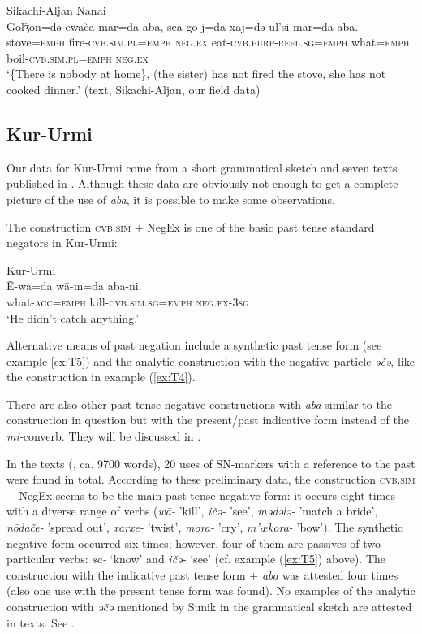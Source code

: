 \documentclass[output=paper,colorlinks,citecolor=brown]{langscibook}
\begin{document}
\ea Sikachi-Aljan Nanai \label{ex:T13}\\
	\gll Golǯon=də	ewača-mar=da	aba, sea-go-j=da	xaj=də	ul’si-mar=da	aba.\\
	stove=\textsc{emph}	fire-\textsc{cvb.sim.pl=emph}	\textsc{neg.ex} eat-\textsc{cvb.purp-refl.sg=emph}	what=\textsc{emph}	boil-\textsc{cvb.sim.pl=emph}	\textsc{neg.ex}\\
	\glt `\{There is nobody at home\}, (the sister) has not fired the stove, she has not cooked dinner.' (text, Sikachi-Aljan, our field data)
\z

\subsection{Kur-Urmi}\label{sec:T5.3}

Our data for Kur-Urmi come from a short grammatical sketch and seven texts published in \citet{sunik1958a}. Although these data are obviously not enough to get a complete picture of the use of \textit{aba}, it is possible to make some observations.

The construction \textsc{cvb.sim} + NegEx is one of the basic past tense standard negators in Kur-Urmi:

\newpage
\ea Kur-Urmi \label{ex:T14}\\
	\gll Ē-wa=da	wā-m=da	aba-ni.\\
	what-\textsc{acc=emph}	kill-\textsc{cvb.sim.sg=emph}	\textsc{neg.ex-3sg}\\
	\glt `He didn’t catch anything.' \citep[134, text]{sunik1958a}
\z

Alternative means of past negation include a synthetic past tense form (see example \ref{ex:T5}) and the analytic construction with the negative particle \textit{əčə}, like the construction in example (\ref{ex:T4}).

There are also other past tense negative constructions with \textit{aba} similar to the construction in question but with the present/past indicative form instead of the \textit{mi-}converb. They will be discussed in .

In the texts (\citealp{sunik1958a}, ca. 9700 words), 20 uses of SN-markers with a reference to the past were found in total. According to these preliminary data, the construction \textsc{cvb.sim} + NegEx seems to be the main past tense negative form: it occurs eight times with a diverse range of verbs (\textit{wā-} 'kill’, \textit{ičə-} 'see’, \textit{mədələ-} 'match a bride’, \textit{nōdače-} 'spread out', \textit{xarxe-} 'twist', \textit{mora-} 'cry', \textit{m’ækora-} 'bow’). The synthetic negative form occurred six times; however, four of them are passives of two particular verbs: \textit{sa-} ‘know’ and \textit{ičə-} ‘see’ (cf. example (\ref{ex:T5}) above). The construction with the indicative past tense form + \textit{aba} was attested four times (also one use with the present tense form was found). No examples of the analytic construction with \textit{əčə} mentioned by Sunik in the grammatical sketch are attested in texts. See .
\end{document}
